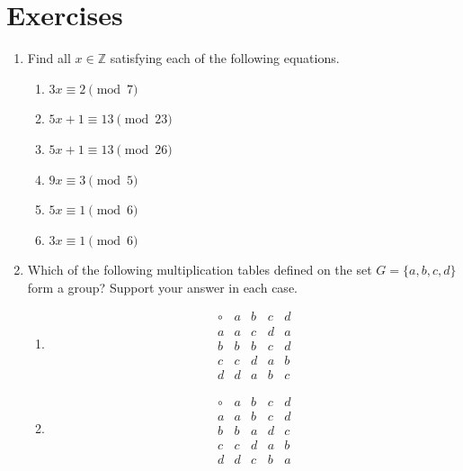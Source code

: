  
\section*{Exercises}
\exrule

{\small
\begin{enumerate}

\item
Find all $x \in {\mathbb Z}$ satisfying each of the following equations.
\begin{multicols}{2}
\begin{enumerate}

\item 
$3x \equiv 2 \pmod{ 7}$

\item
$5x + 1 \equiv 13 \pmod{ 23}$

\item
$5x + 1 \equiv 13 \pmod{ 26}$

\item
$9x \equiv 3 \pmod{ 5}$

\item
$5x \equiv 1 \pmod{ 6}$

\item
$3x \equiv 1 \pmod{ 6}$

\end{enumerate}
\end{multicols}
  

 
 \item   %
Which of the following multiplication tables defined on the set $G =
\{ a, b, c, d \}$ form a group? Support your answer in each case. 
\begin{multicols}{2}
\begin{enumerate}

\item
\[
\begin{array}{c|cccc}
\circ & a & b & c & d \\
\hline
a & a & c & d & a \\
b & b & b & c & d \\
c & c & d & a & b \\
d & d & a & b & c
\end{array}
\]



\item
\[
\begin{array}{c|cccc}
\circ & a & b & c & d \\
\hline
a & a & b & c & d \\
b & b & a & d & c \\
c & c & d & a & b \\
d & d & c & b & a
\end{array}
\]


\end{enumerate}
\end{multicols}
\end{enumerate}}
